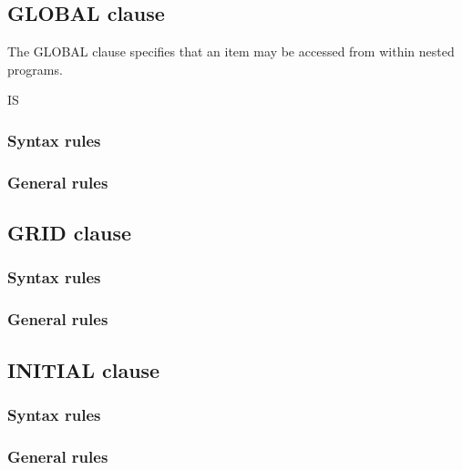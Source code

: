 \subsection{GLOBAL clause}

The GLOBAL clause specifies that an item may be accessed from within nested programs.

\begin{syntax}
  IS 
\end{syntax}

\subsubsection{Syntax rules}

\subsubsection{General rules}

\subsection{GRID clause}

\begin{syntax}[\miscextcolour]
\end{syntax}

\subsubsection{Syntax rules}

\subsubsection{General rules}

\subsection{INITIAL clause}

\begin{syntax}
\end{syntax}

\subsubsection{Syntax rules}

\subsubsection{General rules}

